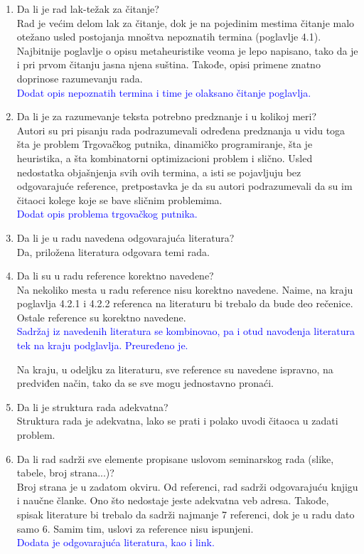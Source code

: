\documentclass[a4paper]{report}
\newcommand{\odgovor}[1]{\textcolor{blue}{#1}}
\begin{document}
\begin{enumerate}
\item Da li je rad lak-težak za čitanje?\\
Rad je većim delom lak za čitanje, dok je na pojedinim mestima čitanje malo otežano usled postojanja mnoštva nepoznatih termina (poglavlje 4.1). Najbitnije poglavlje o opisu metaheuristike veoma je lepo napisano, tako da je i pri prvom čitanju jasna njena suština. Takođe, opisi primene znatno doprinose razumevanju rada.\\
\odgovor{Dodat opis nepoznatih termina i time je olaksano čitanje poglavlja.\\}
\item Da li je za razumevanje teksta potrebno predznanje i u kolikoj meri?\\
Autori su pri pisanju rada podrazumevali određena predznanja u vidu toga šta je problem Trgovačkog putnika, dinamičko programiranje, šta je heuristika, a šta kombinatorni optimizacioni problem i slično. Usled nedostatka objašnjenja svih ovih termina, a isti se pojavljuju bez odgovarajuće reference, pretpostavka je da su autori podrazumevali da su im čitaoci kolege koje se bave sličnim problemima.\\
\odgovor{Dodat opis problema trgovačkog putnika.\\} 
\item Da li je u radu navedena odgovarajuća literatura?\\
Da, priložena literatura odgovara temi rada.

\item Da li su u radu reference korektno navedene?\\
Na nekoliko mesta u radu reference nisu korektno navedene. Naime, na kraju poglavlja 4.2.1 i 4.2.2 referenca na literaturu bi trebalo da bude deo rečenice. Ostale reference su korektno navedene.\\
\odgovor{Sadržaj iz navedenih literatura se kombinovao, pa i otud navođenja literatura tek na kraju podglavlja. Preuređeno je.\\} 

Na kraju, u odeljku za literaturu, sve reference su navedene ispravno, na predviđen način, tako da se sve mogu jednostavno pronaći.

\item Da li je struktura rada adekvatna?\\
Struktura rada je adekvatna, lako se prati i polako uvodi čitaoca u zadati problem.

\item Da li rad sadrži sve elemente propisane uslovom seminarskog rada (slike, tabele, broj strana...)?\\
Broj strana je u zadatom okviru. Od referenci, rad sadrži odgovarajuću knjigu i naučne članke. Ono što nedostaje jeste adekvatna veb adresa. Takođe, spisak literature bi trebalo da sadrži najmanje 7 referenci, dok je u radu dato samo 6. Samim tim, uslovi za reference nisu ispunjeni.\\
\odgovor{Dodata je odgovarajuća literatura, kao i link.}


\end{enumerate}
\end{document}
